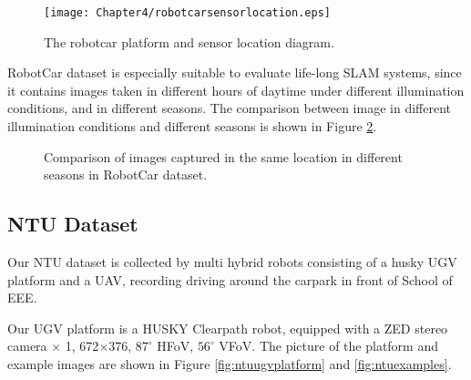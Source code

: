 \begin{figure}[H]
	\centering
	\texttt{[image: Chapter4/robotcarsensorlocation.eps]}
	\caption{The robotcar platform and sensor location diagram.}
	\label{fig:robotcarsensorlocation} 
\end{figure}

RobotCar dataset is especially suitable to evaluate life-long SLAM systems, since it contains images taken in different hours of daytime under different illumination conditions, and in different seasons. The comparison between image in different illumination conditions and different seasons is shown in Figure \ref{fig:robotcarcomparisonseason}.

\begin{figure}
	\centering
	\caption{Comparison of images captured in the same location in different seasons in RobotCar dataset.}
	\label{fig:robotcarcomparisonseason}
\end{figure}
	
\subsection{NTU Dataset}
\label{sec:ntuinfo}
Our NTU dataset is collected by multi hybrid robots consisting of a husky UGV platform and a UAV, recording driving around the carpark in front of School of EEE.

Our UGV platform is a HUSKY Clearpath robot, equipped with a ZED stereo camera $\times$ 1, 672$\times$376, $87^{\circ}$ HFoV, $56^{\circ}$ VFoV. The picture of the platform and example images are shown in Figure \ref{fig:ntuugvplatform} and \ref{fig:ntuexamples}.


